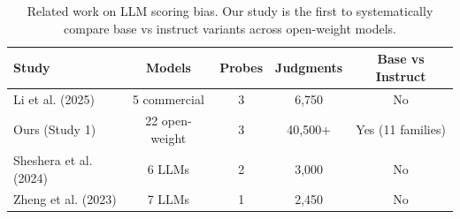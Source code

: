 \begin{table}[h]
\centering\small
\caption{Related work on LLM scoring bias. Our study is the first to systematically
compare base vs instruct variants across open-weight models.}
\label{tab:related}
\begin{tabular}{lcccc}
\toprule
\textbf{Study} & \textbf{Models} & \textbf{Probes} & \textbf{Judgments} & \textbf{Base vs Instruct} \\
\midrule
Li et al. (2025) & 5 commercial & 3 & 6,750 & No \\
Ours (Study 1) & 22 open-weight & 3 & 40,500+ & Yes (11 families) \\
Sheshera et al. (2024) & 6 LLMs & 2 & 3,000 & No \\
Zheng et al. (2023) & 7 LLMs & 1 & 2,450 & No \\
\bottomrule
\end{tabular}
\end{table}

